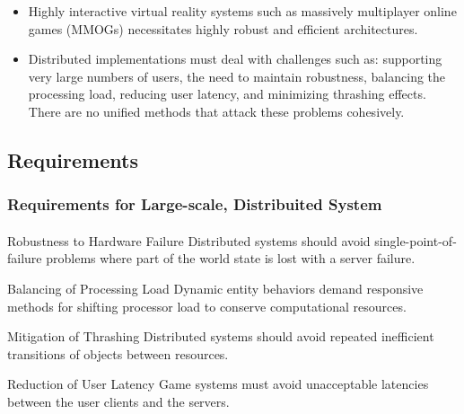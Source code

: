 \begin{frame}
\begin{itemize}[<+->]
\item
Highly interactive virtual reality systems such as massively multiplayer
online games (MMOGs) necessitates highly robust and efficient architectures.
\item
Distributed implementations must deal with challenges such as: supporting
\alert{very
large numbers of users}, the need to maintain robustness, balancing the
processing load, reducing user latency, and minimizing thrashing effects.
There are no unified methods that attack these problems cohesively.
\end{itemize}
\end{frame}

\subsection{Requirements}

\begin{frame}
\frametitle{Requirements for Large-scale, Distribuited System}
\framesubtitle{}
\begin{block}{Robustness to Hardware Failure}
Distributed systems
should \alert{avoid single-point-of-failure} problems where part of the
world state is lost with a server failure.
\end{block}
\pause
\begin{block}{Balancing of Processing Load}
Dynamic entity behaviors
demand responsive methods for shifting processor load to
\alert{conserve computational resources}.
\end{block}
\pause
\begin{block}{Mitigation of Thrashing}
Distributed systems should \alert{avoid
repeated inefficient transitions} of objects between resources.
\end{block}
\pause
\begin{block}{Reduction of User Latency}
Game systems must \alert{avoid
unacceptable latencies} between the user clients and the servers.
\end{block}
\end{frame}

